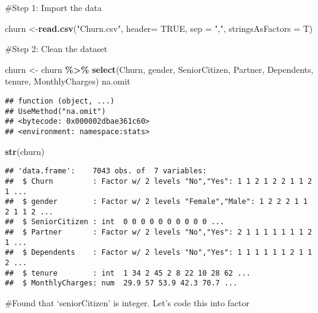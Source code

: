 \documentclass[
]{article}
\newenvironment{Shaded}{\begin{snugshade}}{\end{snugshade}}
\newcommand{\AttributeTok}[1]{\textcolor[rgb]{0.13,0.29,0.53}{#1}}
\newcommand{\ConstantTok}[1]{\textcolor[rgb]{0.56,0.35,0.01}{#1}}
\newcommand{\FunctionTok}[1]{\textcolor[rgb]{0.13,0.29,0.53}{\textbf{#1}}}
\newcommand{\NormalTok}[1]{#1}
\newcommand{\OtherTok}[1]{\textcolor[rgb]{0.56,0.35,0.01}{#1}}
\newcommand{\SpecialCharTok}[1]{\textcolor[rgb]{0.81,0.36,0.00}{\textbf{#1}}}
\newcommand{\StringTok}[1]{\textcolor[rgb]{0.31,0.60,0.02}{#1}}
\begin{document}
\#Step 1: Import the data

\begin{Shaded}
\begin{Highlighting}[]
\NormalTok{churn }\OtherTok{\textless{}{-}}\FunctionTok{read.csv}\NormalTok{(}\StringTok{"Churn.csv"}\NormalTok{, }\AttributeTok{header=} \ConstantTok{TRUE}\NormalTok{, }\AttributeTok{sep =} \StringTok{","}\NormalTok{, }\AttributeTok{stringsAsFactors =}\NormalTok{ T) }
\end{Highlighting}
\end{Shaded}

\#Step 2: Clean the dataset

\begin{Shaded}
\begin{Highlighting}[]
\NormalTok{churn }\OtherTok{\textless{}{-}}\NormalTok{ churn }\SpecialCharTok{\%\textgreater{}\%}
  \FunctionTok{select}\NormalTok{(Churn, gender, SeniorCitizen, Partner, Dependents, tenure, MonthlyCharges)}
\NormalTok{na.omit}
\end{Highlighting}
\end{Shaded}

\begin{verbatim}
## function (object, ...) 
## UseMethod("na.omit")
## <bytecode: 0x000002dbae361c60>
## <environment: namespace:stats>
\end{verbatim}

\begin{Shaded}
\begin{Highlighting}[]
\FunctionTok{str}\NormalTok{(churn)}
\end{Highlighting}
\end{Shaded}

\begin{verbatim}
## 'data.frame':    7043 obs. of  7 variables:
##  $ Churn         : Factor w/ 2 levels "No","Yes": 1 1 2 1 2 2 1 1 2 1 ...
##  $ gender        : Factor w/ 2 levels "Female","Male": 1 2 2 2 1 1 2 1 1 2 ...
##  $ SeniorCitizen : int  0 0 0 0 0 0 0 0 0 0 ...
##  $ Partner       : Factor w/ 2 levels "No","Yes": 2 1 1 1 1 1 1 1 2 1 ...
##  $ Dependents    : Factor w/ 2 levels "No","Yes": 1 1 1 1 1 1 2 1 1 2 ...
##  $ tenure        : int  1 34 2 45 2 8 22 10 28 62 ...
##  $ MonthlyCharges: num  29.9 57 53.9 42.3 70.7 ...
\end{verbatim}

\#Found that `seniorCitizen' is integer. Let's code this into factor
\end{document}
